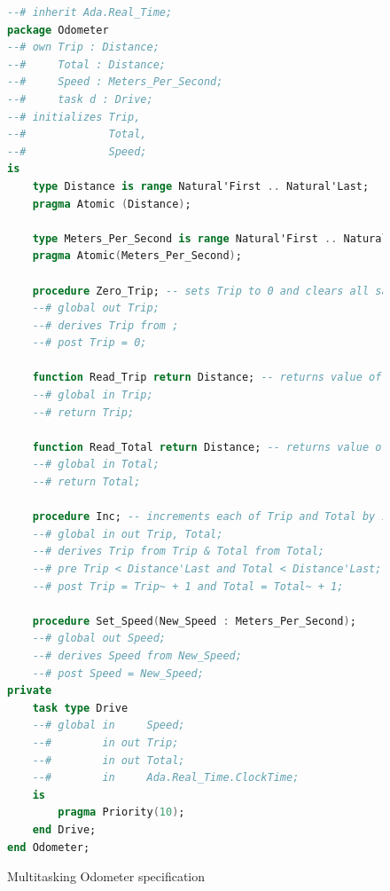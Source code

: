 \begin{figure}
\singlespacing
\begin{lstlisting}[language=ada, frame=single, gobble=0]
--# inherit Ada.Real_Time;
package Odometer
--# own Trip : Distance;
--#     Total : Distance;
--#     Speed : Meters_Per_Second;
--#     task d : Drive;
--# initializes Trip, 
--#             Total,
--#             Speed;
is
    type Distance is range Natural'First .. Natural'Last;
    pragma Atomic (Distance);
    
    type Meters_Per_Second is range Natural'First .. Natural'Last;
    pragma Atomic(Meters_Per_Second);
    
    procedure Zero_Trip; -- sets Trip to 0 and clears all saved Trip marks.
    --# global out Trip;
    --# derives Trip from ;
    --# post Trip = 0;
    
    function Read_Trip return Distance; -- returns value of Trip.
    --# global in Trip;
    --# return Trip;
    
    function Read_Total return Distance; -- returns value of Total
    --# global in Total;
    --# return Total;
    
    procedure Inc; -- increments each of Trip and Total by 1.
    --# global in out Trip, Total;
    --# derives Trip from Trip & Total from Total;
    --# pre Trip < Distance'Last and Total < Distance'Last;
    --# post Trip = Trip~ + 1 and Total = Total~ + 1;

    procedure Set_Speed(New_Speed : Meters_Per_Second);
    --# global out Speed;
    --# derives Speed from New_Speed;
    --# post Speed = New_Speed;                             
private    	    
    task type Drive
    --# global in     Speed;
    --#        in out Trip;
    --#        in out Total;
    --#        in     Ada.Real_Time.ClockTime;
    is
        pragma Priority(10);
    end Drive;	    
end Odometer;
\end{lstlisting} 
\doublespacing
\caption{Multitasking Odometer specification}
\label{listing:Odometer2005Tasking_spec}
\end{figure}

